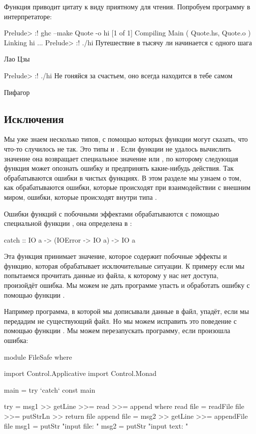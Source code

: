 Функция  приводит цитату к виду приятному для чтения.
Попробуем программу в интерпретаторе:


\begin{code}
Prelude> :! ghc --make Quote -o hi
[1 of 1] Compiling Main             ( Quote.hs, Quote.o )
Linking hi ...
Prelude> :! ./hi
Путешествие в тысячу ли начинается с одного шага

Лао Цзы


Prelude> :! ./hi
Не гоняйся за счастьем, оно всегда находится в тебе самом

Пифагор
\end{code}

\subsection{Исключения}

Мы уже знаем несколько типов, с помощью которых функции могут сказать,
что что-то случилось не так. Это типы  и . Если
функции не удалось вычислить значение она возвращает специальное
значение  или , по которому следующая
функция может опознать ошибку и предпринять какие-нибудь действия. Так
обрабатываются ошибки в чистых функциях. В этом разделе мы узнаем о том,
как обрабатываются ошибки, которые происходят при взаимодействии с
внешним миром, ошибки, которые происходят внутри типа .

Ошибки функций с побочными эффектами обрабатываются с помощью
специальной функции , она определена в :


\begin{code}
catch :: IO a -> (IOError -> IO a) -> IO a
\end{code}

Эта функция принимает значение, которое содержит побочные эффекты и
функцию, которая обрабатывает исключительные ситуации. К примеру если мы
попытаемся прочитать данные из файла, к которому у нас нет доступа,
произойдёт ошибка. Мы можем не дать программе упасть и обработать ошибку
с помощью функции .

Например программа, в которой мы дописывали данные в файл, упадёт, если
мы передадим не существующий файл. Но мы можем исправить это поведение с
помощью функции . Мы можем перезапускать программу, если
произошла ошибка:


\begin{code}
module FileSafe where

import Control.Applicative
import Control.Monad

main = try `catch` const main

try = msg1 >> getLine >>= read >>= append
    where read   file = readFile file >>= putStrLn >> return file
          append file = msg2 >> getLine >>= appendFile file
          msg1        = putStr "input file: "
          msg2        = putStr "input text: "
\end{code}

